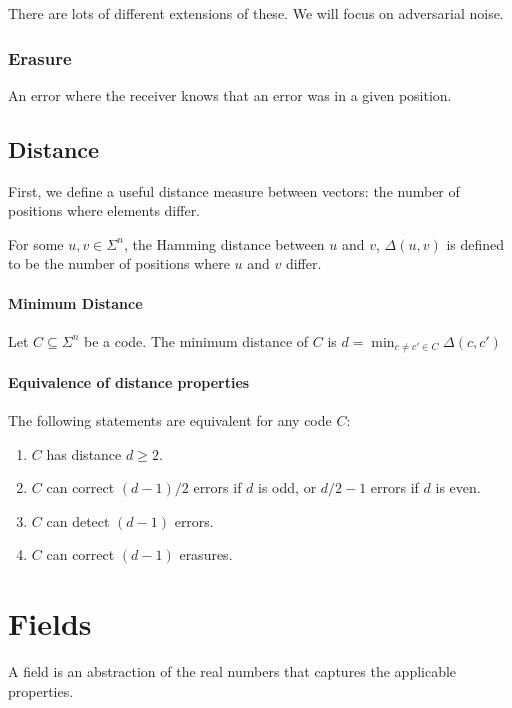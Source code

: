 \documentclass{idc_msc}
\begin{document}
There are lots of different extensions of these.
We will focus on adversarial noise.

\subsubsection{Erasure}

An error where the receiver knows that an error was in a given position.

\subsection{Distance}

First, we define a useful distance measure between vectors: the number of positions where elements differ.

For some $u,v \in \Sigma^n$, the Hamming distance between $u$ and $v$, $\Delta(u,v)$ is defined to be the number of positions where $u$ and $v$ differ.

\paragraph{Minimum Distance}

Let $C \subseteq \Sigma^n$ be a code. The minimum distance of $C$ is $d = \min_{c \ne c' \in C} \Delta(c,c')$

\paragraph{Equivalence of distance properties}

The following statements are equivalent for any code $C$:

\begin{enumerate}
  \item $C$ has distance $d \ge 2$.
  \item $C$ can correct $(d-1) / 2$ errors if $d$ is odd, or $d / 2 - 1$ errors if $d$ is even.
  \item $C$ can detect $(d-1)$ errors.
  \item $C$ can correct $(d-1)$ erasures.
\end{enumerate}

\clearpage
\section{Fields}

A field is an abstraction of the real numbers that captures the applicable properties.
\end{document}
